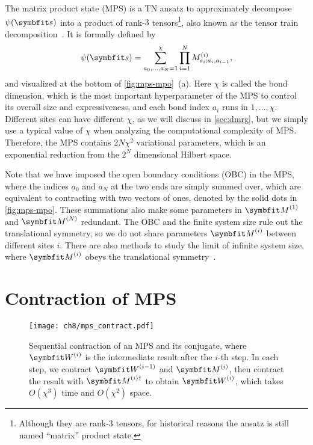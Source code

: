 The matrix product state (MPS) is a TN ansatz to approximately decompose $\psi(\vs)$ into a product of rank-$3$ tensors\footnote{Although they are rank-$3$ tensors, for historical reasons the ansatz is still named ``matrix'' product state.}, also known as the tensor train decomposition~\cite{oseledets2011tensor}. It is formally defined by
\begin{equation}
\psi(\vs) = \sum_{a_0, \ldots, a_N = 1}^\chi \prod_{i = 1}^N M^{(i)}_{s_i; a_i, a_{i - 1}},
\label{eq:mps}
\end{equation}
and visualized at the bottom of \cref{fig:mps-mpo}~(a). Here $\chi$ is called the bond dimension, which is the most important hyperparameter of the MPS to control its overall size and expressiveness, and each bond index $a_i$ runs in $1, \ldots, \chi$. Different sites can have different $\chi$, as we will discuss in \cref{sec:dmrg}, but we simply use a typical value of $\chi$ when analyzing the computational complexity of MPS. Therefore, the MPS contains $2 N \chi^2$ variational parameters, which is an exponential reduction from the $2^N$ dimensional Hilbert space.

Note that we have imposed the open boundary conditions (OBC) in the MPS, where the indices $a_0$ and $a_N$ at the two ends are simply summed over, which are equivalent to contracting with two vectors of ones, denoted by the solid dots in \cref{fig:mps-mpo}. These summations also make some parameters in $\mM^{(1)}$ and $\mM^{(N)}$ redundant. The OBC and the finite system size rule out the translational symmetry, so we do not share parameters $\mM^{(i)}$ between different sites $i$. There are also methods to study the limit of infinite system size, where $\mM^{(i)}$ obeys the translational symmetry~\cite{mcculloch2008infinite}.

\section{Contraction of MPS}
\label{sec:mps-contract}

\begin{figure}[htb]
\centering
\texttt{[image: ch8/mps\_contract.pdf]} \hspace*{0.1\linewidth}
\caption[Sequential contraction of MPS]{
Sequential contraction of an MPS and its conjugate, where $\mW^{(i)}$ is the intermediate result after the $i$-th step. In each step, we contract $\mW^{(i - 1)}$ and $\mM^{(i)}$, then contract the result with $\mM^{(i) \dagger}$ to obtain $\mW^{(i)}$, which takes $O(\chi^3)$ time and $O(\chi^2)$ space.
}
\label{fig:mps-contract}
\end{figure}

